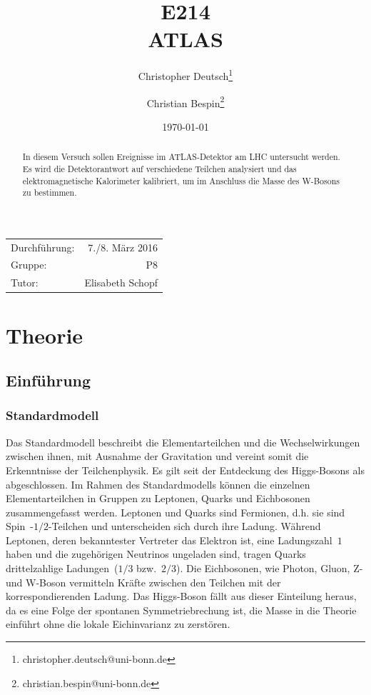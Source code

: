 \documentclass[11pt, a4paper]{article}
\title{E214 \\ ATLAS}
\author{Christopher Deutsch\footnote{christopher.deutsch@uni-bonn.de} \and Christian Bespin\footnote{christian.bespin@uni-bonn.de}}
\date{\today}
\numberwithin{equation}{section}
\begin{document}
\begin{titlepage}

\maketitle

\begin{center}
\begin{tabular}{l r}
Durchführung: & 7./8. März 2016 \\
Gruppe: & P8 \\
Tutor: & Elisabeth Schopf
\end{tabular}
\end{center}

\begin{abstract}
\noindent In diesem Versuch sollen Ereignisse im ATLAS-Detektor am LHC untersucht werden.
Es wird die Detektorantwort auf verschiedene Teilchen analysiert und das elektromagnetische Kalorimeter kalibriert, um im Anschluss die Masse des W-Bosons zu bestimmen.
\end{abstract}

\end{titlepage}

\tableofcontents
\newpage

\section{Theorie}

\subsection{Einführung}

\subsubsection{Standardmodell}

Das Standardmodell beschreibt die Elementarteilchen und die Wechselwirkungen zwischen ihnen, mit Ausnahme der Gravitation und vereint somit die Erkenntnisse der Teilchenphysik.
Es gilt seit der Entdeckung des Higgs-Bosons als abgeschlossen.
Im Rahmen des Standardmodells können die einzelnen Elementarteilchen in Gruppen zu Leptonen, Quarks und Eichbosonen zusammengefasst werden.
Leptonen und Quarks sind Fermionen, d.h. sie sind Spin~-$1/2$-Teilchen und unterscheiden sich durch ihre Ladung.
Während Leptonen, deren bekanntester Vertreter das Elektron ist, eine Ladungszahl~$1$ haben und die zugehörigen Neutrinos ungeladen sind, tragen Quarks drittelzahlige Ladungen~($1/3$ bzw.~$2/3$).
Die Eichbosonen, wie Photon, Gluon, Z- und W-Boson vermitteln Kräfte zwischen den Teilchen mit der korrespondierenden Ladung.
Das Higgs-Boson fällt aus dieser Einteilung heraus, da es eine Folge der spontanen Symmetriebrechung ist, die Masse in die Theorie einführt ohne die lokale Eichinvarianz zu zerstören.
\end{document}
